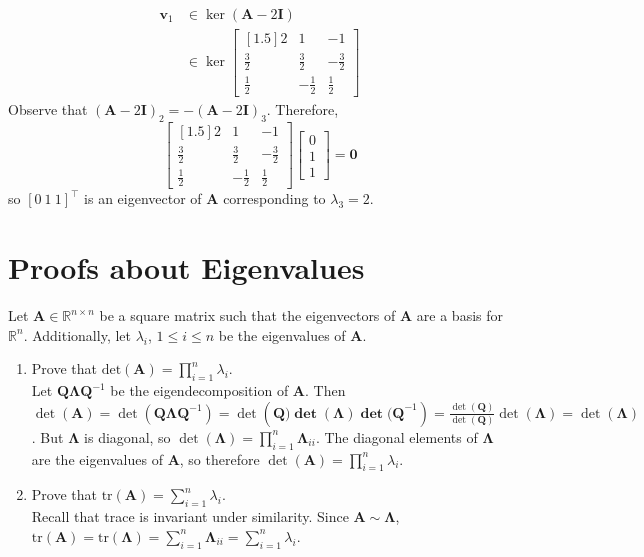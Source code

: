 \documentclass{article}
\begin{document}
\begin{enumerate}
{\begin{align*}
\mathbf{v}_1 &\in \ker(\mathbf{A} - 2\mathbf{I}) \\
&\in \ker\begin{bmatrix}[1.5] 2 & 1 & -1 \\ \frac{3}{2} & \frac{3}{2} & -\frac{3}{2} \\ \frac{1}{2} & -\frac{1}{2} & \frac{1}{2}\end{bmatrix}
\end{align*} Observe that $(\mathbf{A} - 2\mathbf{I})_2 = -(\mathbf{A} - 2\mathbf{I})_3$. Therefore, $$\begin{bmatrix}[1.5] 2 & 1 & -1 \\ \frac{3}{2} & \frac{3}{2} & -\frac{3}{2} \\ \frac{1}{2} & -\frac{1}{2} & \frac{1}{2}\end{bmatrix}\begin{bmatrix}0 \\ 1 \\ 1\end{bmatrix} = \mathbf{0}$$ so $[0\ 1\ 1]^{\top}$ is an eigenvector of $\mathbf{A}$ corresponding to $\lambda_3 = 2$.}
\end{enumerate}

\section{Proofs about Eigenvalues}
\noindent Let $\mathbf{A} \in \mathbb{R}^{n \times n}$ be a square matrix such that the eigenvectors of $\mathbf{A}$ are a basis for $\mathbb{R}^n$. Additionally, let $\lambda_i$, $1 \leq i \leq n$ be the eigenvalues of $\mathbf{A}$.
\begin{enumerate}
\item Prove that $\text{det}(\mathbf{A}) = \prod\limits_{i = 1}^n \lambda_i$. \\
{\color{blue} Let $\mathbf{Q\Lambda Q}^{-1}$ be the eigendecomposition of $\mathbf{A}$. Then $\det(\mathbf{A}) = \det(\mathbf{Q\Lambda Q}^{-1}) = \det(\mathbf{Q)\det(\Lambda)\det(Q}^{-1}) = \frac{\det(\mathbf{Q})}{\det(\mathbf{Q})}\det(\mathbf{\Lambda}) = \det(\mathbf{\Lambda})$. But $\mathbf{\Lambda}$ is diagonal, so $\det(\mathbf{\Lambda}) = \prod\limits_{i = 1}^n \mathbf{\Lambda}_{ii}$. The diagonal elements of $\mathbf{\Lambda}$ are the eigenvalues of $\mathbf{A}$, so therefore $\det(\mathbf{A}) = \prod\limits_{i=1}^n \lambda_i$.}
\item Prove that $\text{tr}(\mathbf{A}) = \sum\limits_{i = 1}^n \lambda_i$. \\
{\color{blue} Recall that trace is invariant under similarity. Since $\mathbf{A} \sim \mathbf{\Lambda}$, $\text{tr}(\mathbf{A}) = \text{tr}(\mathbf{\Lambda}) = \sum\limits_{i = 1}^n \mathbf{\Lambda}_{ii} = \sum\limits_{i = 1}^n \lambda_i$.}
\end{enumerate}
\end{document}

